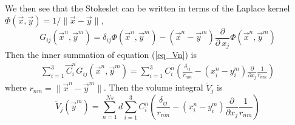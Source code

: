 We then see that the Stokeslet can be written in terms of the Laplace kernel $\Phi(\vec{x},\vec{y}) = 1/{\| \vec{x} - \vec{y} \|}$,
\begin{equation}
	G_{ij}(\vec{x}^n,\vec{y}^m)
	 =  \delta_{ij} \Phi(\vec{x}^n, \vec{y}^m)
	 - (\vec{x}^n - \vec{y}^m)
	 \frac{\partial}{\partial \ x_j}
	\Phi(\vec{x}^n, \vec{y}^m)
	\label{eq_Gij}
\end{equation}
Then the inner summation of equation (\ref{eq_Vn}) is
\begin{align*}
 \sum_{i = 1}^{3}
 	\vec{C}^n_{i} G_{ij}(\vec{x}^n,\vec{y}^m)
 	=  \sum_{i = 1}^{3} {C}^n_{i} 
	\left(
	\frac{\delta_{ij}}{r_{nm}}
	- \left( x_i^n - y_i^m \right)
	 \frac{\partial}{\partial x_j}
	\frac{1}{r_{nm}}
	\right)
\end{align*}
where $r_{nm} = \|\vec{x}^n - \vec{y}^m \|$.
Then the volume integral $\tilde{V}_j$ is 
\begin{equation}
	\tilde{V}_j (\vec{y}^m)=
	\sum_{n=1}^{Ns}
	d
   \sum_{i = 1}^{3} {C}^n_{i} 
  	\left(
  	\frac{\delta_{ij}}{r_{nm}}
  	- \left( x_i^n - y_i^m \right)
  	 \frac{\partial}{\partial x_j}
  	\frac{1}{r_{nm}}
  	\right)
 \label{eq_frm_lplc_stokes}
\end{equation}
